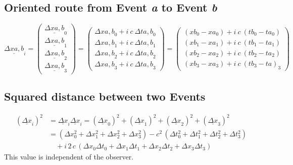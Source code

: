 \documentclass[]{article}
\begin{document}
\subsection{Oriented route from Event \textit{a} to Event \textit{b}}
\begin{equation}
\underline{\Delta x{\scriptstyle a,b}}_i
=
\begin{pmatrix}
	\underline{{\scriptstyle \Delta}x{\scriptstyle a,b}}_0\\
	\underline{{\scriptstyle \Delta}x{\scriptstyle a,b}}_1\\
	\underline{{\scriptstyle \Delta}x{\scriptstyle a,b}}_2\\
	\underline{{\scriptstyle \Delta}x{\scriptstyle a,b}}_3
\end{pmatrix}
=
\begin{pmatrix}
	{\scriptstyle \Delta}x{\scriptstyle a,b}_0 + i\ c\ {\scriptstyle \Delta}t{\scriptstyle a,b}_0\\
	{\scriptstyle \Delta}x{\scriptstyle a,b}_1 + i\ c\ {\scriptstyle \Delta}t{\scriptstyle a,b}_1\\
	{\scriptstyle \Delta}x{\scriptstyle a,b}_2 + i\ c\ {\scriptstyle \Delta}t{\scriptstyle a,b}_2\\
	{\scriptstyle \Delta}x{\scriptstyle a,b}_3 + i\ c\ {\scriptstyle \Delta}t{\scriptstyle a,b}_3
\end{pmatrix}
=
\begin{pmatrix}
	(x{\scriptstyle b}_0-x{\scriptstyle a}_0) + i\ c\ (t{\scriptstyle b}_0-t{\scriptstyle a}_0)\\
	(x{\scriptstyle b}_1-x{\scriptstyle a}_1) + i\ c\ (t{\scriptstyle b}_1-t{\scriptstyle a}_1)\\
	(x{\scriptstyle b}_2-x{\scriptstyle a}_2) + i\ c\ (t{\scriptstyle b}_2-t{\scriptstyle a}_2)\\
	(x{\scriptstyle b}_3-x{\scriptstyle a}_3) + i\ c\ (t{\scriptstyle b}_3-t{\scriptstyle a})_3
\end{pmatrix}
\end{equation}

\subsection{Squared distance between two Events}
\begin{equation}
\begin{split}
(\underline{\Delta x}_i)^2
&=
\underline{\Delta x}_i \underline{\Delta x}_i
=
(\underline{\Delta x}_0)^2 +
(\underline{\Delta x}_1)^2 +
(\underline{\Delta x}_2)^2 +
(\underline{\Delta x}_3)^2
\\%
&=
(\Delta x_0^2+\Delta x_1^2+\Delta x_2^2+\Delta x_3^2)
- c^2\,(\Delta t_0^2+\Delta t_1^2+\Delta t_2^2+\Delta t_3^2)
\\%
&\quad + i\, 2\, c\, (\Delta x_0 \Delta t_0 + \Delta x_1 \Delta t_1 +\Delta x_2 \Delta t_2 +\Delta x_3 \Delta t_3)
\end{split}
\end{equation}
This value is independent of the observer.
\end{document}
